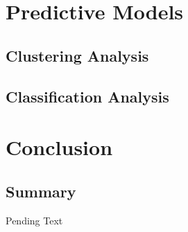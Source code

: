\documentclass[12pt, a4paper]{article}
\begin{document}
    \section*{Predictive Models}\label{sec:predictive-models}
    \subsection{Clustering Analysis}\label{subsec:clustering-analysis}

    \subsection{Classification Analysis}\label{subsec:classification-analysis}

    \section*{Conclusion}
    \subsection{Summary}\label{subsec:summary}
        Pending Text
\end{document}
